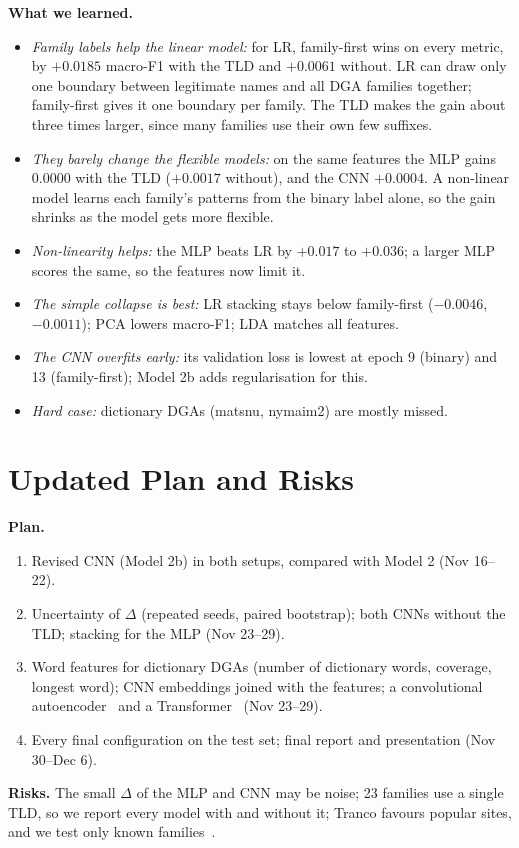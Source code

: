\documentclass[11pt]{article}
\begin{document}
\textbf{What we learned.}
\begin{itemize}
  \item \emph{Family labels help the linear model:} for LR, family-first wins on
  every metric, by $+0.0185$ macro-F1 with the TLD and $+0.0061$ without. LR can
  draw only one boundary between legitimate names and all DGA families together;
  family-first gives it one boundary per family. The TLD makes the gain about
  three times larger, since many families use their own few suffixes.
  \item \emph{They barely change the flexible models:} on the same features the
  MLP gains $0.0000$ with the TLD ($+0.0017$ without), and the CNN $+0.0004$. A
  non-linear model learns each family's patterns from the binary label alone, so the
  gain shrinks as the model gets more flexible.
  \item \emph{Non-linearity helps:} the MLP beats LR by $+0.017$ to $+0.036$; a
  larger MLP scores the same, so the features now limit it.
  \item \emph{The simple collapse is best:} LR stacking stays below family-first
  ($-0.0046$, $-0.0011$); PCA lowers macro-F1; LDA matches all features.
  \item \emph{The CNN overfits early:} its validation loss is lowest at epoch 9
  (binary) and 13 (family-first); Model 2b adds regularisation for this.
  \item \emph{Hard case:} dictionary DGAs (matsnu, nymaim2) are mostly missed.
\end{itemize}

\section{Updated Plan and Risks}
\textbf{Plan.}
\begin{enumerate}
  \item Revised CNN (Model 2b) in both setups, compared with Model 2 (Nov 16--22).
  \item Uncertainty of $\Delta$ (repeated seeds, paired bootstrap); both CNNs
  without the TLD; stacking for the MLP (Nov 23--29).
  \item Word features for dictionary DGAs (number of dictionary words, coverage,
  longest word); CNN embeddings joined with the features; a convolutional
  autoencoder~\cite{masci2011cae} and a Transformer~\cite{vaswani2017attention} (Nov 23--29).
  \item Every final configuration on the test set; final report and presentation
  (Nov 30--Dec 6).
\end{enumerate}

\textbf{Risks.} The small $\Delta$ of the MLP and CNN may be noise;
23 families use a single TLD, so we report every model with and
without it; Tranco favours popular sites, and we test only known
families~\cite{dahal2019autoencoded}.




\end{document}
